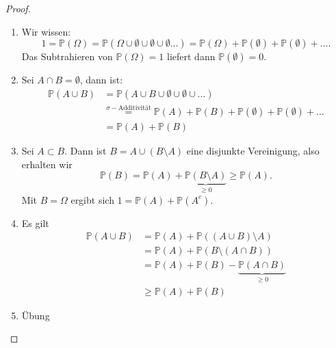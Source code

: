 \begin{proof}
    \begin{enumerate}[label=\protect\circled{\alph*}]
        \item Wir wissen:
            \[
                1= \mathbb{P}(\Omega) = \mathbb{P}\left( \Omega \cup \emptyset \cup \emptyset \cup \emptyset \ldots  \right)  = \mathbb{P}(\Omega) + \mathbb{P}(\emptyset) + \mathbb{P}(\emptyset) + \ldots
            .\] 
            Das Subtrahieren von $\mathbb{P}(\Omega) =1$ liefert dann $\mathbb{P}(\emptyset) = 0$.
        \item Sei $A \cap B = \emptyset$, dann ist:
            \begin{equation*}
                \begin{split}
                    \mathbb{P}(A\cup B ) &= \mathbb{P}(A \cup B \cup \emptyset \cup \emptyset \cup \ldots) \\
                                         &\stackrel{σ-\text{Additivität}}{=} \mathbb{P}(A) + \mathbb{P}(B) + \mathbb{P}(\emptyset) + \mathbb{P}(\emptyset) + \ldots \\
                                         &= \mathbb{P}(A) + \mathbb{P}(B)
                \end{split}
            \end{equation*}
        \item Sei $A\subset B$. Dann ist $B = A \cup (B \setminus A)$ eine disjunkte Vereinigung, also erhalten wir
            \[
                \mathbb{P}(B) = \mathbb{P}(A) + \underbrace{\mathbb{P}(B \setminus A)}_{\geq 0} \geq  \mathbb{P}(A)
            .\] 
            Mit $B = \Omega$ ergibt sich  $1 = \mathbb{P}(A) + \mathbb{P}(A^{c})$.
        \item Es gilt
            \begin{equation}
                \begin{split}
                    \mathbb{P}(A \cup B) &= \mathbb{P}(A) + \mathbb{P}((A \cup B) \setminus A)  \\
                                         &= \mathbb{P}(A) + \mathbb{P}(B \setminus (A \cap B)) \\
                                         &= \mathbb{P}(A) + \mathbb{P}(B) - \underbrace{\mathbb{P}(A \cap B)}_{\geq 0} \\
                                         &\geq \mathbb{P}(A) + \mathbb{P}(B)
                \end{split}
            \end{equation}
        \item Übung
    \end{enumerate}
\end{proof}

